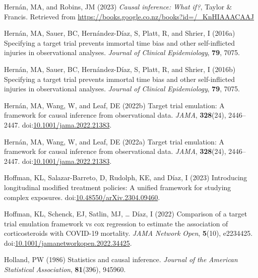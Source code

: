 \documentclass[
  singlecolumn]{article}
\newlength{\cslhangindent}
\newlength{\cslentryspacingunit} %
\newenvironment{CSLReferences}[2] %
 {%
  \setlength{\parindent}{0pt}
  \ifodd #1
  \let\oldpar\par
  \def\par{\hangindent=\cslhangindent\oldpar}
  \fi
  \setlength{\parskip}{#2\cslentryspacingunit}
 }%
 {}
\begin{document}
\begin{CSLReferences}{1}{0}
\leavevmode{}%
Hernán, MA, and Robins, JM (2023) \emph{Causal inference: What if?},
Taylor \& Francis. Retrieved from
\url{https://books.google.co.nz/books?id=/_KnHIAAACAAJ}

\leavevmode{}%
Hernán, MA, Sauer, BC, Hernández-Díaz, S, Platt, R, and Shrier, I
(2016a) Specifying a target trial prevents immortal time bias and other
self-inflicted injuries in observational analyses. \emph{Journal of
Clinical Epidemiology}, \textbf{79}, 7075.

\leavevmode{}%
Hernán, MA, Sauer, BC, Hernández-Díaz, S, Platt, R, and Shrier, I
(2016b) Specifying a target trial prevents immortal time bias and other
self-inflicted injuries in observational analyses. \emph{Journal of
Clinical Epidemiology}, \textbf{79}, 7075.

\leavevmode{}%
Hernán, MA, Wang, W, and Leaf, DE (2022b) Target trial emulation: A
framework for causal inference from observational data. \emph{JAMA},
\textbf{328}(24), 2446--2447.
doi:\href{https://doi.org/10.1001/jama.2022.21383}{10.1001/jama.2022.21383}.

\leavevmode{}%
Hernán, MA, Wang, W, and Leaf, DE (2022a) Target trial emulation: A
framework for causal inference from observational data. \emph{JAMA},
\textbf{328}(24), 2446--2447.
doi:\href{https://doi.org/10.1001/jama.2022.21383}{10.1001/jama.2022.21383}.

\leavevmode{}%
Hoffman, KL, Salazar-Barreto, D, Rudolph, KE, and Díaz, I (2023)
Introducing longitudinal modified treatment policies: A unified
framework for studying complex exposures.
doi:\href{https://doi.org/10.48550/arXiv.2304.09460}{10.48550/arXiv.2304.09460}.

\leavevmode{}%
Hoffman, KL, Schenck, EJ, Satlin, MJ, \ldots{} Díaz, I (2022) Comparison
of a target trial emulation framework vs cox regression to estimate the
association of corticosteroids with COVID-19 mortality. \emph{JAMA
Network Open}, \textbf{5}(10), e2234425.
doi:\href{https://doi.org/10.1001/jamanetworkopen.2022.34425}{10.1001/jamanetworkopen.2022.34425}.

\leavevmode{}%
Holland, PW (1986) Statistics and causal inference. \emph{Journal of the
American Statistical Association}, \textbf{81}(396), 945960.


\end{CSLReferences}
\end{document}
